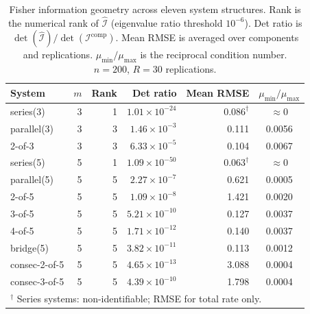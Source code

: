 \documentclass[12pt]{article}
\theoremstyle{definition}
\theoremstyle{remark}
\begin{document}
\begin{table}[t]
\centering
\caption{Fisher information geometry across eleven system structures.
  Rank is the numerical rank of $\hat{\mathcal{I}}$ (eigenvalue ratio
  threshold $10^{-6}$).  Det ratio is
  $\det(\hat{\mathcal{I}}) / \det(\mathcal{I}^{\mathrm{comp}})$.
  Mean RMSE is averaged over components and replications.
  $\mu_{\min}/\mu_{\max}$ is the reciprocal condition number.
  $n = 200$, $R = 30$ replications.}
\label{tab:fisher-summary}
\small
\begin{tabular}{lrrrrc}
\toprule
System & $m$ & Rank & Det ratio & Mean RMSE & $\mu_{\min}/\mu_{\max}$ \\
\midrule
series(3) & 3 & 1 & $1.01 \times 10^{-24}$ & $0.086^\dagger$ & $\approx 0$ \\
parallel(3) & 3 & 3 & $1.46 \times 10^{-3}$ & 0.111 & 0.0056 \\
2-of-3 & 3 & 3 & $6.33 \times 10^{-5}$ & 0.104 & 0.0067 \\
\midrule
series(5) & 5 & 1 & $1.09 \times 10^{-50}$ & $0.063^\dagger$ & $\approx 0$ \\
parallel(5) & 5 & 5 & $2.27 \times 10^{-7}$ & 0.621 & 0.0005 \\
2-of-5 & 5 & 5 & $1.09 \times 10^{-8}$ & 1.421 & 0.0020 \\
3-of-5 & 5 & 5 & $5.21 \times 10^{-10}$ & 0.127 & 0.0037 \\
4-of-5 & 5 & 5 & $1.71 \times 10^{-12}$ & 0.140 & 0.0037 \\
bridge(5) & 5 & 5 & $3.82 \times 10^{-11}$ & 0.113 & 0.0012 \\
consec-2-of-5 & 5 & 5 & $4.65 \times 10^{-13}$ & 3.088 & 0.0004 \\
consec-3-of-5 & 5 & 5 & $4.39 \times 10^{-10}$ & 1.798 & 0.0004 \\
\bottomrule
\multicolumn{6}{l}{\footnotesize $^\dagger$ Series systems: non-identifiable; RMSE for total rate only.}
\end{tabular}
\end{table}
\end{document}
